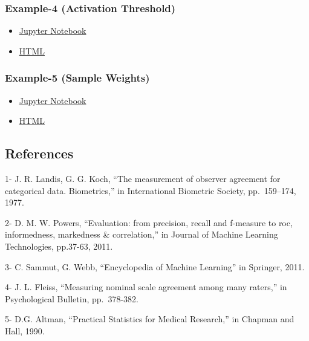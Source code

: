 \documentclass[11pt]{article}
\providecommand{\tightlist}{%
      \setlength{\itemsep}{0pt}\setlength{\parskip}{0pt}}
\begin{document}
\hypertarget{example-4-activation-threshold}{%
\subsubsection{Example-4 (Activation
Threshold)}\label{example-4-activation-threshold}}

\begin{itemize}
\tightlist
\item
  \href{https://nbviewer.jupyter.org/github/sepandhaghighi/pycm/blob/master/Document/Example4.ipynb}{Jupyter
  Notebook}
\item
  \href{http://www.shaghighi.ir/pycm/doc/Example4.html}{HTML}
\end{itemize}

\hypertarget{example-5-sample-weights}{%
\subsubsection{Example-5 (Sample
Weights)}\label{example-5-sample-weights}}

\begin{itemize}
\tightlist
\item
  \href{https://nbviewer.jupyter.org/github/sepandhaghighi/pycm/blob/master/Document/Example5.ipynb}{Jupyter
  Notebook}
\item
  \href{http://www.shaghighi.ir/pycm/doc/Example5.html}{HTML}
\end{itemize}

    \hypertarget{references}{%
\subsection{References}\label{references}}

    1- J. R. Landis, G. G. Koch, ``The measurement of observer agreement for
categorical data. Biometrics,'' in International Biometric Society,
pp.~159--174, 1977.

2- D. M. W. Powers, ``Evaluation: from precision, recall and f-measure
to roc, informedness, markedness \& correlation,'' in Journal of Machine
Learning Technologies, pp.37-63, 2011.

3- C. Sammut, G. Webb, ``Encyclopedia of Machine Learning'' in Springer,
2011.

4- J. L. Fleiss, ``Measuring nominal scale agreement among many
raters,'' in Psychological Bulletin, pp.~378-382.

5- D.G. Altman, ``Practical Statistics for Medical Research,'' in
Chapman and Hall, 1990.
\end{document}
